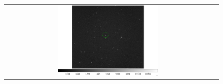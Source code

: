 \documentclass[letterpaper,12pt]{article}
\begin{document}
\begin{figure}[h!]
\begin{tabular}{cc}
                                                                                                                                                                                                                                                                                                                                                                                                                                                                                                                                                                                                                                                                                                                                                                                                                                                                                                                                                                                                                                                                                                                                                                                                                                                                                                                                                                                                                                                                                                                                                       \includegraphics[width=0.5\textwidth]{asteroid_19.png} &

\end{tabular}
\end{figure}
\end{document}
